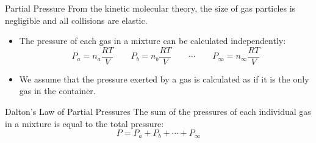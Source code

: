 \documentclass[notes=hide]{beamer}
\begin{document}



\clearpage

\begin{frame}{Partial Pressure}
	From the kinetic molecular theory, the size of gas particles is
	negligible and all collisions are elastic.
	\begin{itemize}
		\item The pressure of each gas in a mixture can be calculated
			independently:
			\begin{equation*}
				P_a = n_a \frac{RT}{V} \qquad P_b = n_b
				\frac{RT}{V} \qquad
				\cdots \qquad P_\infty = n_\infty \frac{RT}{V}
			\end{equation*}
		\item We assume that the pressure exerted by a gas is calculated
			as if it is the only gas in the container.
	\end{itemize}

	\pause

	\bigskip

	\begin{block}{Dalton's Law of Partial Pressures}
		The sum of the pressures of each individual gas in a mixture is
		equal to the total pressure:
		\begin{equation*}
			P = P_a + P_b + \cdots + P_\infty
		\end{equation*}
	\end{block}
\end{frame}
\end{document}
